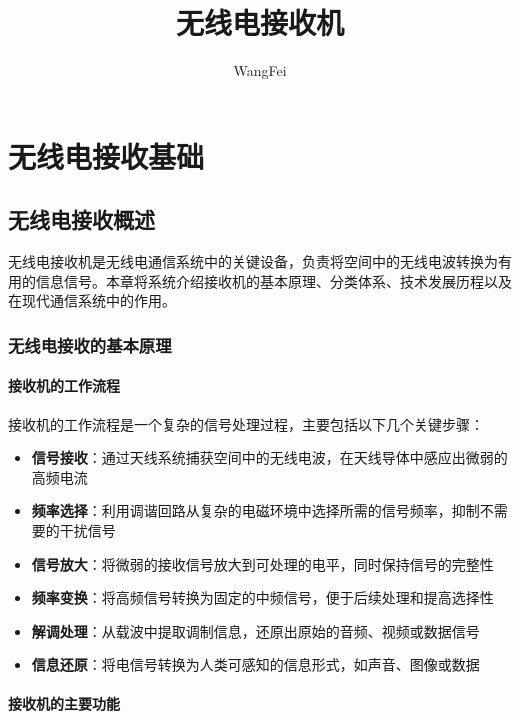 \documentclass[12pt,UTF8]{ctexbook}
\title{\heiti\zihao{0} 无线电接收机}
\author{WangFei}
\date{}
\begin{document}
\maketitle
\tableofcontents

\frontmatter

\mainmatter

\part{无线电接收基础}

\chapter{无线电接收概述}

无线电接收机是无线电通信系统中的关键设备，负责将空间中的无线电波转换为有用的信息信号。本章将系统介绍接收机的基本原理、分类体系、技术发展历程以及在现代通信系统中的作用。

\section{无线电接收的基本原理}

\subsection{接收机的工作流程}

接收机的工作流程是一个复杂的信号处理过程，主要包括以下几个关键步骤：

\begin{itemize}[leftmargin=3.5em]
    \item \textbf{信号接收}：通过天线系统捕获空间中的无线电波，在天线导体中感应出微弱的高频电流
    \item \textbf{频率选择}：利用调谐回路从复杂的电磁环境中选择所需的信号频率，抑制不需要的干扰信号
    \item \textbf{信号放大}：将微弱的接收信号放大到可处理的电平，同时保持信号的完整性
    \item \textbf{频率变换}：将高频信号转换为固定的中频信号，便于后续处理和提高选择性
    \item \textbf{解调处理}：从载波中提取调制信息，还原出原始的音频、视频或数据信号
    \item \textbf{信息还原}：将电信号转换为人类可感知的信息形式，如声音、图像或数据
\end{itemize}

\subsection{接收机的主要功能}
\end{document}

